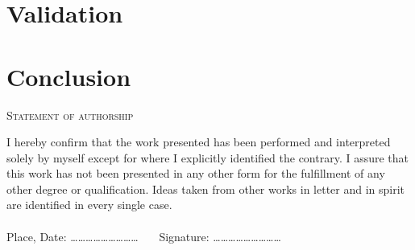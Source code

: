 \documentclass[a4paper,captions=tableheading,12pt]{scrartcl}
\begin{document}
	\section{Validation} \label{sec:validation}
	
	
	\section{Conclusion} \label{sec:conclusion}
	
	
	\pagebreak
	\printbibliography[title={References}]
	
%	
%	
	
	\clearpage 
	\begin{center}
		\textsc{Statement of authorship}
	\end{center}
	I  hereby confirm that the  work  presented  has  been  performed  and interpreted solely by myself except for where I explicitly identified the contrary. I assure  that  this  work  has not been presented in  any  other form  for  the  fulfillment  of  any  other  degree  or  qualification.  Ideas taken  from  other  works in  letter and  in  spirit are identified in every single case.
	\\ \\
	Place, Date: \dots\dots \dots \dots \dots \dots \dots \dots \dots ~~~ Signature: \dots \dots \dots \dots \dots \dots \dots \dots \dots
\end{document}
